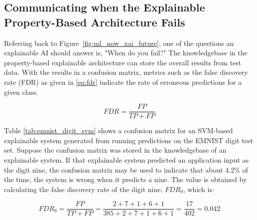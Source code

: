 \subsection{Communicating when the Explainable Property-Based Architecture Fails}

Referring back to Figure~\ref{fig:ml_now_xai_future}, one of the questions an
explainable AI should answer is, "When do you fail?" The knowledgebase in the
property-based explainable architecture can store the overall results from test
data. With the results in a confusion matrix, metrics such as the false
discovery rate (FDR) as given in \eqref{eq:fdr} indicate the rate of erroneous
predictions for a given class.

\begin{equation}\label{eq:fdr}
    FDR = \frac{FP}{TP + FP} 
\end{equation}

Table \ref{tab:emnist_digit_svm} shows a confusion matrix for an SVM-based
explainable system generated from running predictions on the EMNIST digit test
set. Suppose the confusion matrix was stored in the knowledgebase of an
explainable system. If that explainable system predicted an application input as
the digit nine, the confusion matrix may be used to indicate that about 4.2\% of
the time, the system is wrong when it predicts a nine. The value is obtained by
calculating the false discovery rate of the digit nine, $FDR_9$, which is:

\begin{equation}\label{eq:fdr_9}
    FDR_9 = \frac{FP}{TP + FP} = \frac{2+7+1+6+1}{385+2+7+1+6+1} =  \frac{17}{402} = 0.042
\end{equation}

